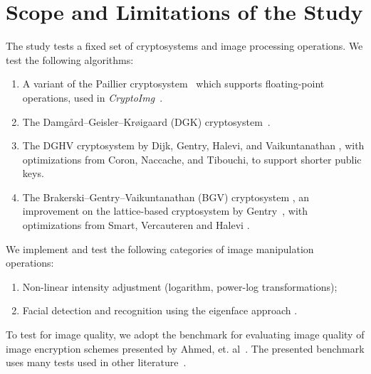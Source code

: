 \section{Scope and Limitations of the Study}
The study tests a fixed set of cryptosystems and image processing operations. 
We test the following algorithms:
\begin{enumerate}
	\item A variant of the Paillier cryptosystem~\cite{stern_public-key_1999} which supports floating-point operations, used in \textit{CryptoImg}~\cite{ziad_cryptoimg:_2016}.
  \item The Damg{\aa}rd--Geisler--Kr{\o}igaard (DGK) cryptosystem~\cite{pieprzyk_efficient_2007, cryptoeprint:2008:321}.
	\item The DGHV cryptosystem by Dijk, Gentry, Halevi, and Vaikuntanathan \cite{cryptoeprint:2009:616}, with optimizations from Coron, Naccache, and Tibouchi, \cite{cryptoeprint:2011:277, cryptoeprint:2011:440} to support shorter public keys.
	\item The Brakerski--Gentry--Vaikuntanathan (BGV) cryptosystem \cite{cryptoeprint:2011:277}, an improvement on the lattice-based cryptosystem by Gentry~\cite{gentry_fully_2009}, with optimizations from Smart, Vercauteren and Halevi \cite{hutchison_fully_2010, cryptoeprint:2011:566}.
\end{enumerate}
We implement and test the following categories of image manipulation operations:
\begin{enumerate}
	\item Non-linear intensity adjustment (logarithm, power-log transformations);
	\item Facial detection and recognition using the eigenface approach \cite{turk_eigenfaces_1991}.
\end{enumerate}
To test for image quality, we adopt the benchmark for evaluating image quality of image encryption schemes presented by Ahmed, et. al~\cite{ahmed_benchmark_2016}. The presented benchmark uses many tests used in other literature~\cite{ahmad_efficiency_2012, wu_npcr_2011}.
